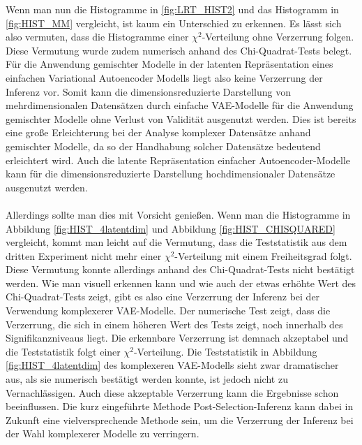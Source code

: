 \documentclass[%
thesis=student,%
coverpage=false,%
titlepage=false,%
headmarks=true, %
german,%
font=libertine, %
math=newpxtx, %
BCOR=5mm,%
coverBCOR=11mm%
]{tumbook}
\theoremstyle{break}
\begin{document}
Wenn man nun die Histogramme in \ref{fig:LRT_HIST2} und das Histogramm in \ref{fig:HIST_MM} vergleicht, ist kaum ein Unterschied zu erkennen. Es lässt sich also vermuten, dass die Histogramme einer $\chi^2$-Verteilung ohne Verzerrung folgen. Diese Vermutung wurde zudem numerisch anhand des Chi-Quadrat-Tests belegt. Für die Anwendung gemischter Modelle in der latenten Repräsentation eines einfachen Variational Autoencoder Modells liegt also keine Verzerrung der Inferenz vor. Somit kann die dimensionsreduzierte Darstellung von mehrdimensionalen Datensätzen durch einfache VAE-Modelle für die Anwendung gemischter Modelle ohne Verlust von Validität ausgenutzt werden. Dies ist bereits eine große Erleichterung bei der Analyse komplexer Datensätze anhand gemischter Modelle, da so der Handhabung solcher Datensätze bedeutend erleichtert wird. Auch die latente Repräsentation einfacher Autoencoder-Modelle kann für die dimensionsreduzierte Darstellung hochdimensionaler Datensätze ausgenutzt werden. \\
\\
Allerdings sollte man dies mit Vorsicht genießen. Wenn man die Histogramme in Abbildung \ref{fig:HIST_4latentdim} und Abbildung \ref{fig:HIST_CHISQUARED} vergleicht, kommt man leicht auf die Vermutung, dass die Teststatistik aus dem dritten Experiment nicht mehr einer $\chi^2$-Verteilung mit einem Freiheitsgrad folgt. Diese Vermutung konnte allerdings  anhand des  Chi-Quadrat-Tests nicht bestätigt werden. Wie man visuell erkennen kann und wie auch der etwas erhöhte Wert des Chi-Quadrat-Tests zeigt, gibt es also eine Verzerrung der Inferenz bei der Verwendung komplexerer VAE-Modelle. Der numerische Test zeigt, dass die Verzerrung, die sich in einem höheren Wert des Tests zeigt, noch innerhalb des Signifikanzniveaus liegt. Die erkennbare Verzerrung ist demnach akzeptabel und die Teststatistik folgt einer $\chi^2$-Verteilung. Die Teststatistik in Abbildung \ref{fig:HIST_4latentdim} des komplexeren VAE-Modells sieht zwar dramatischer aus, als sie numerisch bestätigt werden konnte, ist jedoch nicht zu Vernachlässigen. Auch diese akzeptable Verzerrung kann die Ergebnisse schon beeinflussen. Die kurz eingeführte Methode Post-Selection-Inferenz kann dabei in Zukunft eine vielversprechende Methode sein, um die Verzerrung der Inferenz bei der Wahl komplexerer Modelle zu verringern.
\\
\end{document}
